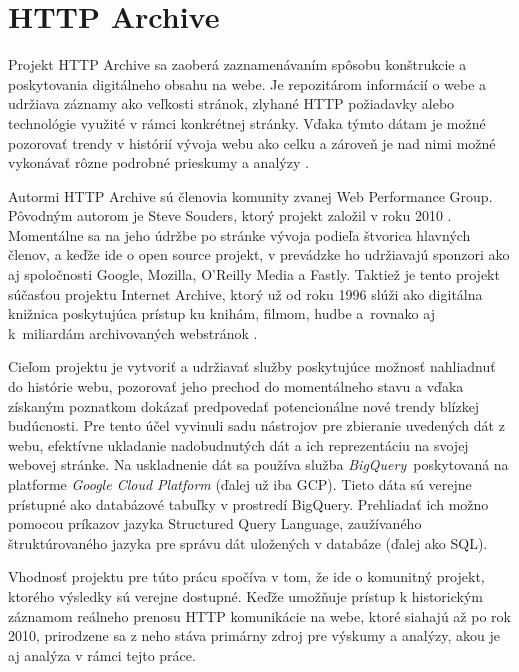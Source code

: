 
\section{HTTP Archive}
\label{httparchive}

Projekt HTTP Archive sa zaoberá zaznamenávaním spôsobu konštrukcie a poskytovania digitálneho obsahu na webe. 
Je repozitárom informácií o webe a udržiava záznamy ako veľkosti
stránok, zlyhané HTTP požiadavky alebo technológie využité v rámci konkrétnej stránky. 
Vďaka týmto dátam je možné pozorovať trendy v histórií vývoja webu ako celku a zároveň je nad nimi možné vykonávať rôzne podrobné prieskumy a analýzy \cite{httparchive-about}. 

Autormi HTTP Archive sú členovia komunity zvanej Web Performance Group. Pôvodným autorom je Steve Souders, ktorý projekt založil v roku 2010 \cite{httparchive-faq}.
Momentálne sa na jeho údržbe po stránke vývoja podieľa štvorica hlavných členov, a keďže ide o open source projekt, v prevádzke ho udržiavajú sponzori ako aj spoločnosti Google, Mozilla, O'Reilly Media a Fastly.
Taktiež je tento projekt súčasťou projektu Internet Archive, ktorý už od roku 1996 slúži ako digitálna knižnica poskytujúca prístup ku knihám, filmom, hudbe \mbox{a rovnako} aj \mbox{k miliardám} archivovaných webstránok \cite{httparchive-about}.

Cieľom projektu je vytvoriť a udržiavať služby poskytujúce možnosť nahliadnuť do histórie webu, pozorovať jeho prechod do momentálneho stavu a vďaka získaným poznatkom dokázať
predpovedať potencionálne nové trendy blízkej budúcnosti. 
Pre tento účel vyvinuli sadu nástrojov pre zbieranie uvedených dát z webu, efektívne ukladanie nadobudnutých dát a ich reprezentáciu na svojej webovej stránke.
Na uskladnenie dát sa používa služba \mbox{\emph{BigQuery} poskytovaná} na platforme \emph{Google Cloud Platform} (ďalej už iba GCP).
Tieto dáta sú verejne prístupné ako databázové tabuľky v prostredí BigQuery.
Prehliadať ich možno pomocou príkazov jazyka Structured Query Language, zaužívaného štruktúrovaného jazyka pre správu dát uložených v databáze (ďalej ako SQL).

Vhodnosť projektu pre túto prácu spočíva v tom, že ide o komunitný projekt, ktorého výsledky sú verejne dostupné. 
Keďže umožňuje prístup k historickým záznamom reálneho prenosu HTTP komunikácie na webe, ktoré siahajú až po rok 2010, prirodzene sa z neho stáva primárny zdroj pre výskumy a analýzy, akou je aj analýza v rámci tejto práce.


